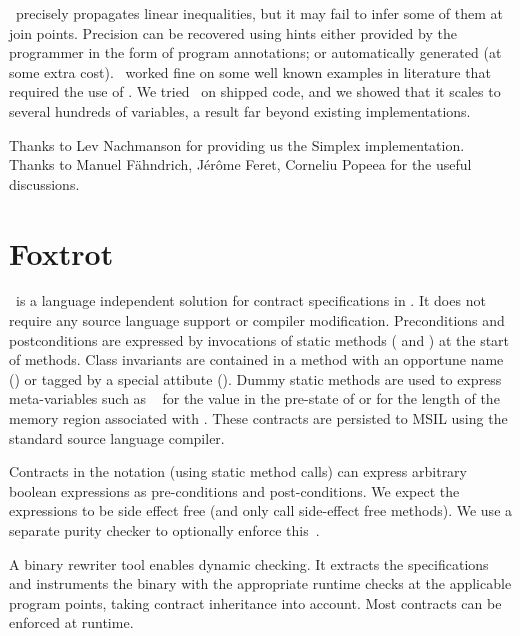 \documentclass[sttt]{svjour}
\begin{document}
\Subpoly\ precisely propagates linear inequalities, but it may fail to infer some of them at join points. 
Precision can be recovered using hints either provided  by the programmer in the form of program annotations; or automatically generated (at some extra cost).
\Subpoly\ worked fine on some well known examples in literature that required the use of \Polyhedra.
We tried \Subpoly\ on shipped code, and we showed that it scales  to several hundreds of variables, a result far beyond existing \Polyhedra{} implementations.




 Thanks to Lev Nachmanson for providing us the Simplex implementation.
Thanks to Manuel F\"ahndrich, J\'er\^ome Feret, Corneliu Popeea for the useful discussions.


{
\small

}

\appendix


\section{Foxtrot}
\label{sec:foxtrot}
\Foxtrot\ is a language independent solution for contract
specifications in \NET.  It does not require any source language
support or compiler modification.  Preconditions and postconditions
are expressed by invocations of static methods
( and ) at the start of
methods.  Class
invariants are contained in a method with an opportune name
() or tagged by a special attibute
(\code{[ObjectInvariant]}).  Dummy static methods are used to express
meta-variables such as \eg\  for the value in the
pre-state of  or  for the
length of the memory region associated with . These contracts are
persisted to MSIL using the standard source language compiler.

Contracts in the \Foxtrot{} notation (using static method calls) can
express arbitrary boolean expressions as pre-conditions and
post-conditions. We expect the expressions to be side effect free (and
only call side-effect free methods). We use a separate purity checker
to optionally enforce this~\cite{BarnettEtAl07}. 

A binary rewriter tool enables dynamic checking.  It extracts the
specifications and instruments the binary with the appropriate runtime
checks at the applicable program points, taking contract inheritance
into account. Most \Foxtrot{} contracts can be enforced at runtime.
\end{document}
